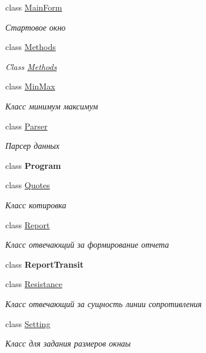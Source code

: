 \begin{DoxyCompactItemize}
class \hyperlink{class_client_1_1_main_form}{Main\+Form}
\begin{DoxyCompactList}\small\item\em Стартовое окно \end{DoxyCompactList}\item 
class \hyperlink{class_client_1_1_methods}{Methods}
\begin{DoxyCompactList}\small\item\em Class \hyperlink{class_client_1_1_methods}{Methods} \end{DoxyCompactList}\item 
class \hyperlink{class_client_1_1_min_max}{Min\+Max}
\begin{DoxyCompactList}\small\item\em Класс минимум максимум \end{DoxyCompactList}\item 
class \hyperlink{class_client_1_1_parser}{Parser}
\begin{DoxyCompactList}\small\item\em Парсер данных \end{DoxyCompactList}\item 
class {\bfseries Program}
\item 
class \hyperlink{class_client_1_1_quotes}{Quotes}
\begin{DoxyCompactList}\small\item\em Класс котировка \end{DoxyCompactList}\item 
class \hyperlink{class_client_1_1_report}{Report}
\begin{DoxyCompactList}\small\item\em Класс отвечающий за формирование отчета \end{DoxyCompactList}\item 
class {\bfseries Report\+Transit}
\item 
class \hyperlink{class_client_1_1_resistance}{Resistance}
\begin{DoxyCompactList}\small\item\em Класс отвечающий за сущность линии сопротивления \end{DoxyCompactList}\item 
class \hyperlink{class_client_1_1_setting}{Setting}
\begin{DoxyCompactList}\small\item\em Класс для задания размеров окнаы \end{DoxyCompactList}\item 

\end{DoxyCompactItemize}
